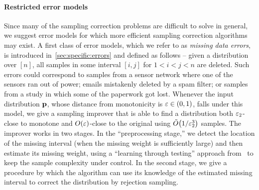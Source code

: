 \paragraph{Restricted error models}
Since many of the sampling correction problems are 
difficult to solve in general, we suggest error models
for which more efficient sampling correction algorithms
may exist. A first class of error models, which we refer to
as  \emph{missing data errors}, is introduced in~\cref{sec:specific:errors} and defined as follows -- given a distribution
over $[n]$, all samples in some interval $[i,j]$ for $1<i<j<n$ are
deleted.  Such errors could correspond to samples from a sensor
network where one of the sensors ran out of power; 
emails mistakenly deleted by a spam filter; or samples
from a study in which some of the paperwork got lost.
Whenever the input distribution $\mathbf{p}$, 
whose distance from monotonicity is {$\varepsilon\in(0,1)$}, 
falls under this model, we give a sampling improver that is able to find 
a distribution both $\varepsilon_2$-close to monotone
 and $\bigO{\eps}$-close to the original 
using $\tildeO{{1}/{\eps_2^{3}}}$ samples. 
The improver works in two stages. In the ``preprocessing stage,'' 
 we detect the location of the missing interval 
(when the missing weight is sufficiently large) 
and then estimate its missing weight, using a 
``learning through testing'' approach from~\cite{DDS:12} to keep the sample complexity under control. 
In the second stage, 
we give a procedure 
by which the algorithm can use its knowledge
of the estimated missing interval to
 correct the distribution by rejection sampling.
 
